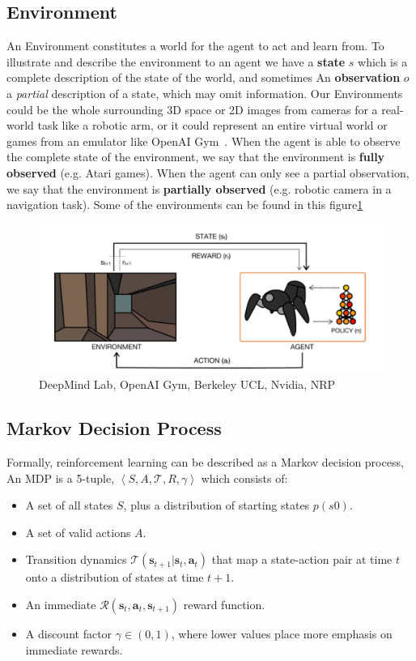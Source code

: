 \subsection{Environment}\label{Environment}
An Environment constitutes a world for the agent to act and learn from. 
To illustrate and describe the environment to an agent we have a \textbf{state} \(s\) which is a complete description of the state of the world, and sometimes An \textbf{observation} \(o\) a \textit{partial} description of a state, which may omit information.
Our Environments could be the whole surrounding 3D space or 2D images from cameras for a real-world task like a robotic arm, or it could represent an entire virtual world or games from an emulator like OpenAI Gym~\parencite{brockman2016openai}.
When the agent is able to observe the complete state of the environment, we say that the environment is \textbf{fully observed} (e.g. Atari games). When the agent can only see a partial observation, we say that the environment is \textbf{partially observed} (e.g. robotic camera in a navigation task).
Some of the environments can be found in this figure\ref{fig:envs}

\begin{figure}[H]
		\begin{center}
				\includegraphics[width=.5\linewidth]{figures/Agent-Env.png}
				\caption{DeepMind Lab, OpenAI Gym, Berkeley UCL, Nvidia, NRP}
				\label{fig:envs}
		\end{center}
\end{figure}


\subsection{Markov Decision Process}
Formally, reinforcement learning can be described as a Markov decision process, An MDP is a 5-tuple, $ \left\langle S, A, \mathcal{T}, R, \gamma \right\rangle $ which consists of:

\begin{itemize}
		\item A set of all states \(S\), plus a distribution of starting states \(p(s0)\).
		\item A set of valid actions \(A\).
		\item Transition dynamics $ \mathcal{T}\left(\mathbf{s}_{t+1} | \mathbf{s}_{t}, \mathbf{a}_{t}\right) $ that map a state-action pair at time \(t\) onto a distribution of states at time \(t+1\).
		\item An immediate $ \mathcal{R}\left(\mathbf{s}_{t}, \mathbf{a}_{t}, \mathbf{s}_{t+1}\right) $ reward function.
		\item A discount factor \(\gamma \in(0,1)\), where lower values place more emphasis on immediate rewards.
\end{itemize}


